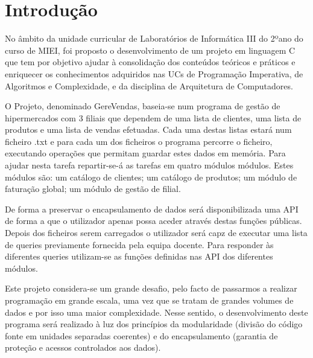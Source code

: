 \chapter{Introdução}

No âmbito da unidade curricular de Laboratórios de Informática III do 2ºano do curso de MIEI,  foi proposto o desenvolvimento de um projeto em linguagem C que tem por objetivo ajudar à consolidação dos conteúdos teóricos e práticos e enriquecer os conhecimentos adquiridos nas UCs de Programação Imperativa, de Algoritmos e Complexidade, e da disciplina de Arquitetura de Computadores. 

O Projeto, denominado GereVendas, baseia-se num programa de gestão de hipermercados com 3 filiais que dependem de uma lista de clientes, uma lista de produtos e uma lista de vendas efetuadas.  Cada uma destas listas estará num ficheiro .txt e para cada um dos ficheiros o programa percorre o ficheiro, executando operações que permitam guardar estes dados em memória. Para ajudar nesta tarefa repartir-se-á as tarefas em quatro módulos
módulos. Estes módulos são: um catálogo de clientes; um catálogo de produtos; um módulo de faturação global; um módulo de gestão de filial.

 De forma a preservar o encapsulamento de dados será disponibilizada uma API de
forma a que o utilizador apenas possa aceder através destas funções públicas. Depois dos ficheiros serem carregados o utilizador será capz de executar uma lista de queries previamente fornecida pela equipa docente. Para responder às diferentes queries utilizam-se as funções definidas nas API dos diferentes módulos. 

Este projeto considera-se um grande desafio, pelo facto de passarmos a realizar programação em grande escala, uma vez que se tratam de grandes volumes de dados e por isso uma maior complexidade. Nesse sentido, o desenvolvimento deste programa será realizado à luz dos princípios da modularidade (divisão do código fonte em unidades separadas coerentes) e do encapsulamento (garantia de proteção e acessos controlados aos dados). 